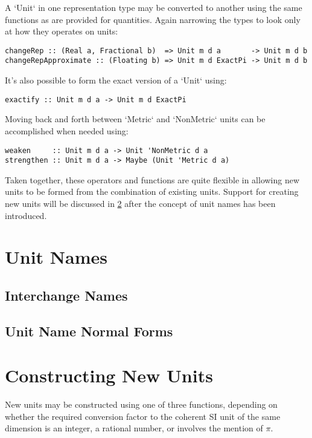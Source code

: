 \documentclass[11pt]{report}
\begin{document}
A `Unit` in one representation type may be converted to another using the same functions as are provided for quantities.
Again narrowing the types to look only at how they operates on units:

\begin{lstlisting}
changeRep :: (Real a, Fractional b)  => Unit m d a       -> Unit m d b
changeRepApproximate :: (Floating b) => Unit m d ExactPi -> Unit m d b
\end{lstlisting}

It's also possible to form the exact version of a `Unit` using:

\begin{lstlisting}
exactify :: Unit m d a -> Unit m d ExactPi
\end{lstlisting}

Moving back and forth between `Metric` and `NonMetric` units can be accomplished when needed using:

\begin{lstlisting}
weaken     :: Unit m d a -> Unit 'NonMetric d a
strengthen :: Unit m d a -> Maybe (Unit 'Metric d a)
\end{lstlisting}

Taken together, these operators and functions are quite flexible in allowing new units to be formed from
the combination of existing units. Support for creating new units will be discussed in \ref{constructing-new-units} after
the concept of unit names has been introduced.

\section{Unit Names}

\subsection{Interchange Names}
\subsection{Unit Name Normal Forms}

\section{Constructing New Units} \label{constructing-new-units}

New units may be constructed using one of three functions, depending on whether the required conversion factor to the coherent
SI unit of the same dimension is an integer, a rational number, or involves the mention of $ \pi $.
\end{document}

